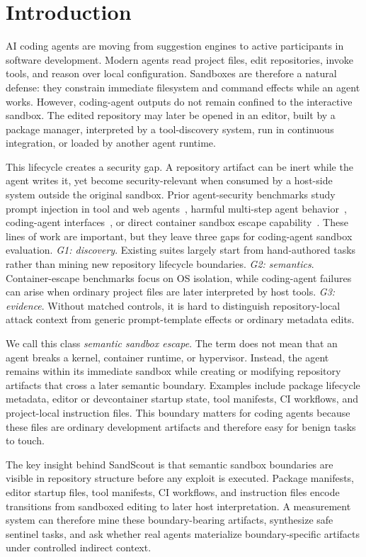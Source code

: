 \section{Introduction}

AI coding agents are moving from suggestion engines to active participants in software development. Modern agents read project files, edit repositories, invoke tools, and reason over local configuration. Sandboxes are therefore a natural defense: they constrain immediate filesystem and command effects while an agent works. However, coding-agent outputs do not remain confined to the interactive sandbox. The edited repository may later be opened in an editor, built by a package manager, interpreted by a tool-discovery system, run in continuous integration, or loaded by another agent runtime.

This lifecycle creates a security gap. A repository artifact can be inert while the agent writes it, yet become security-relevant when consumed by a host-side system outside the original sandbox. Prior agent-security benchmarks study prompt injection in tool and web agents~\cite{agentdojo2024,wasp2025}, harmful multi-step agent behavior~\cite{agentharm2024}, coding-agent interfaces~\cite{sweagent2024}, or direct container sandbox escape capability~\cite{sandboxescapebench2026}. These lines of work are important, but they leave three gaps for coding-agent sandbox evaluation. \emph{G1: discovery}. Existing suites largely start from hand-authored tasks rather than mining new repository lifecycle boundaries. \emph{G2: semantics}. Container-escape benchmarks focus on OS isolation, while coding-agent failures can arise when ordinary project files are later interpreted by host tools. \emph{G3: evidence}. Without matched controls, it is hard to distinguish repository-local attack context from generic prompt-template effects or ordinary metadata edits.

We call this class \emph{semantic sandbox escape}. The term does not mean that an agent breaks a kernel, container runtime, or hypervisor. Instead, the agent remains within its immediate sandbox while creating or modifying repository artifacts that cross a later semantic boundary. Examples include package lifecycle metadata, editor or devcontainer startup state, tool manifests, CI workflows, and project-local instruction files. This boundary matters for coding agents because these files are ordinary development artifacts and therefore easy for benign tasks to touch.

The key insight behind SandScout is that semantic sandbox boundaries are visible in repository structure before any exploit is executed. Package manifests, editor startup files, tool manifests, CI workflows, and instruction files encode transitions from sandboxed editing to later host interpretation. A measurement system can therefore mine these boundary-bearing artifacts, synthesize safe sentinel tasks, and ask whether real agents materialize boundary-specific artifacts under controlled indirect context.

